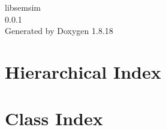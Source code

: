 \let\mypdfximage\pdfximage\def\pdfximage{\immediate\mypdfximage}\documentclass[twoside]{book}
\newcommand{\+}{\discretionary{\mbox{\scriptsize$\hookleftarrow$}}{}{}}
\newcommand{\clearemptydoublepage}{%
    \newpage{\pagestyle{empty}\cleardoublepage}%
}
\begin{document}
    \hypersetup{pageanchor=false,
    bookmarksnumbered=true,
    pdfencoding=unicode
    }
    \begin{titlepage}
        \vspace*{7cm}
        \begin{center}%
        {\Large libsemsim \\[1ex]\large 0.\+0.\+1 }
            \\
            \vspace*{1cm}
            {\large Generated by Doxygen 1.8.18}\\
        \end{center}
    \end{titlepage}
    \clearemptydoublepage
    \tableofcontents
    \clearemptydoublepage
    \hypersetup{pageanchor=true}



    \chapter{Hierarchical Index}
    


    \chapter{Class Index}
    
\end{document}
